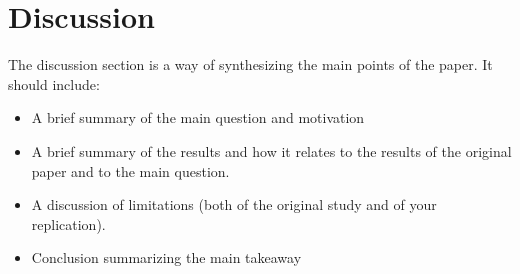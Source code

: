 \documentclass[11pt]{article}
\begin{document}
\section{Discussion}
The discussion section is a way of synthesizing the main points of the paper. It should include:
\begin{itemize}
    \item A brief summary of the main question and motivation
    \item A brief summary of the results and how it relates to the results of the original paper and to the main question.
    \item A discussion of limitations (both of the original study and of your replication).
    \item Conclusion summarizing the main takeaway
\end{itemize}







\end{document}
